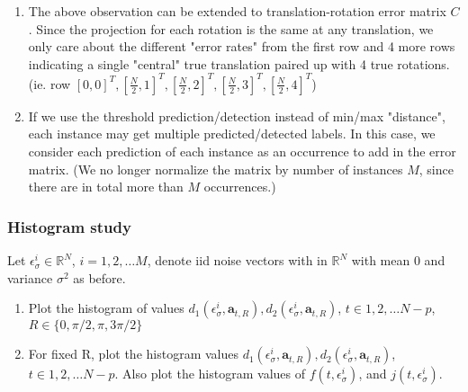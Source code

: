 \documentclass[11pt]{article}
\newcommand{\ba}{\boldsymbol{a}}
\begin{document}
\begin{itemize}
\begin{enumerate}
\begin{itemize}
        \end{itemize}
        \item The above observation can be extended to translation-rotation error matrix $C$. Since the projection for each rotation is the same at any translation, we only care about the different "error rates" from the first row and 4 more rows indicating a single "central" true translation paired up with 4 true rotations. (ie. row $[0, 0]^T, [\frac{N}{2}, 1]^T, [\frac{N}{2}, 2]^T, [\frac{N}{2}, 3]^T, [\frac{N}{2}, 4]^T$)
        \item If we use the threshold prediction/detection instead of min/max "distance", each instance may get multiple predicted/detected labels. In this case, we consider each prediction of each instance as an occurrence to add in the error matrix. (We no longer normalize the matrix by number of instances $M$, since there are in total more than $M$ occurrences.)
        
        
    \end{enumerate}
    
\end{itemize}

\subsubsection{Histogram study}
Let $\epsilon_{\sigma}^{i}  \in \mathbb{R}^{N}$, $i=1,2,\ldots M$, denote iid noise vectors with in $\mathbb{R}^{N}$ with mean $0$ and variance $\sigma^2$ as before. 

\begin{enumerate}
\item Plot the histogram of values $d_{1}(\epsilon_{\sigma}^i, \ba_{t,R}), d_{2}(\epsilon_{\sigma}^i, \ba_{t,R})$, $t\in 1,2,\ldots N-p$, $R \in \{ 0,\pi/2, \pi, 3\pi/2 \}$
\item For fixed R, plot the histogram values $d_{1}(\epsilon_{\sigma}^i, \ba_{t,R}), d_{2}(\epsilon_{\sigma}^i, \ba_{t,R})$, $t\in 1,2,\ldots N-p$. Also plot the histogram values of $f(t,\epsilon_{\sigma}^i)$, and $j(t,\epsilon_{\sigma}^i)$.
\end{enumerate}
\end{document}
